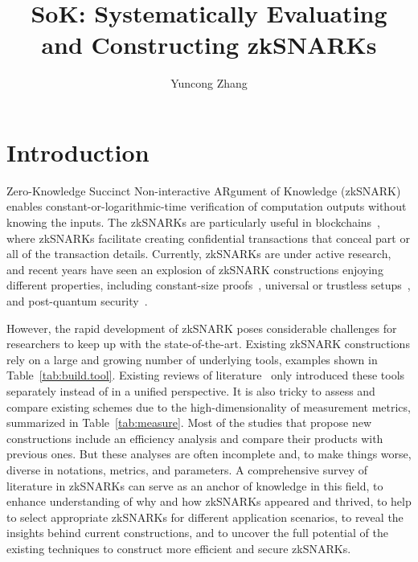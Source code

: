 \documentclass[acmtog]{acmart}
\title{SoK: Systematically Evaluating and Constructing zkSNARKs}
\author{Yuncong Zhang}
\begin{document}
\begin{abstract}
\end{abstract}

\maketitle

\section{Introduction}

Zero-Knowledge Succinct Non-interactive ARgument of Knowledge (zkSNARK)~\cite{BitanskyCCT12} enables constant-or-logarithmic-time verification of computation outputs without knowing the inputs.
The zkSNARKs are particularly useful in blockchains~\cite{Ben-SassonCG0MTV14, SunALY17}, where zkSNARKs facilitate creating confidential transactions that conceal part or all of the transaction details.
Currently, zkSNARKs are under active research, and recent years have seen an explosion of zkSNARK constructions enjoying different properties, including constant-size proofs~\cite{Groth16, GennaroGP013, Ben-SassonCGTV13, ParnoHG013, Ben-SassonCTV13}, universal or trustless setups~\cite{GrothKMMM18, MallerBKM19, BunzFS20, Ben-SassonBHR18, Ben-SassonCRSVW19, AmesHIV17}, and post-quantum security~\cite{Ben-SassonBHR18, Ben-SassonCRSVW19}.


However, the rapid development of zkSNARK poses considerable challenges for researchers to keep up with the state-of-the-art.
Existing zkSNARK constructions rely on a large and growing number of underlying tools, examples shown in Table~\ref{tab:build.tool}.
Existing reviews of literature~\cite{ZKProof20, Nitulescu19, WalfishB15} only introduced these tools separately instead of in a unified perspective.
It is also tricky to assess and compare existing schemes due to the high-dimensionality of measurement metrics, summarized in Table~\ref{tab:measure}.
Most of the studies that propose new constructions include an efficiency analysis and compare their products with previous ones.
But these analyses are often incomplete and, to make things worse, diverse in notations, metrics, and parameters.
A comprehensive survey of literature in zkSNARKs can serve as an anchor of knowledge in this field, to enhance understanding of why and how zkSNARKs appeared and thrived, to help to select appropriate zkSNARKs for different application scenarios, to reveal the insights behind current constructions, and to uncover the full potential of the existing techniques to construct more efficient and secure zkSNARKs.
\end{document}
